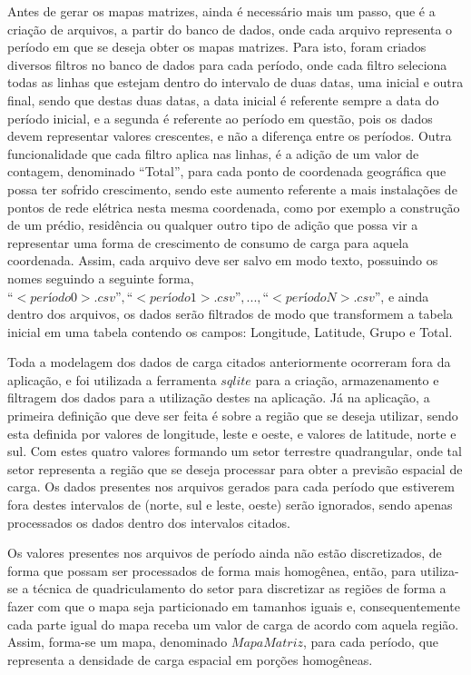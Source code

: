 Antes de gerar os mapas matrizes, ainda é necessário mais um passo, que é a criação de arquivos, a partir do banco de dados, onde cada arquivo representa o período em que se deseja obter os mapas matrizes. Para isto, foram criados diversos filtros no banco de dados para cada período, onde cada filtro seleciona todas as linhas que estejam dentro do intervalo de duas datas, uma inicial e outra final, sendo que destas duas datas, a data inicial é referente sempre a data do período inicial, e a segunda é referente ao período em questão, pois os dados devem representar valores crescentes, e não a diferença entre os períodos. Outra funcionalidade que cada filtro aplica nas linhas, é a adição de um valor de contagem, denominado “Total”, para cada ponto de coordenada geográfica que possa ter sofrido crescimento, sendo este aumento referente a mais instalações de pontos de rede elétrica nesta mesma coordenada, como por exemplo a construção de um prédio, residência ou qualquer outro tipo de adição que possa vir a representar uma forma de crescimento de consumo de carga para aquela coordenada. Assim, cada arquivo deve ser salvo em modo texto, possuindo os nomes seguindo a seguinte forma, \(“<período0>.csv”, “<período1>.csv”, ..., “<períodoN>.csv”\), e ainda dentro dos arquivos, os dados serão filtrados de modo que transformem a tabela inicial em uma tabela contendo os campos: Longitude, Latitude, Grupo e Total.

Toda a modelagem dos dados de carga citados anteriormente ocorreram fora da aplicação, e foi utilizada a ferramenta \(sqlite\) para a criação, armazenamento e filtragem dos dados para a utilização destes na aplicação. Já na aplicação, a primeira definição que deve ser feita é sobre a região que se deseja utilizar, sendo esta definida por valores de longitude, leste e oeste, e valores de latitude, norte e sul. Com estes quatro valores formando um setor terrestre quadrangular, onde tal setor representa a região que se deseja processar para obter a previsão espacial de carga. Os dados presentes nos arquivos gerados para cada período que estiverem fora destes intervalos de (norte, sul e leste, oeste) serão ignorados, sendo apenas processados os dados dentro dos intervalos citados. 

Os valores presentes nos arquivos de período ainda não estão discretizados, de forma que possam ser processados de forma mais homogênea, então, para utiliza-se a técnica de quadriculamento do setor para discretizar as regiões de forma a fazer com que o mapa seja particionado em tamanhos iguais e, consequentemente cada parte igual do mapa receba um valor de carga de acordo com aquela região. Assim, forma-se um mapa, denominado \(Mapa Matriz\), para cada período, que representa a densidade de carga espacial em porções homogêneas.

